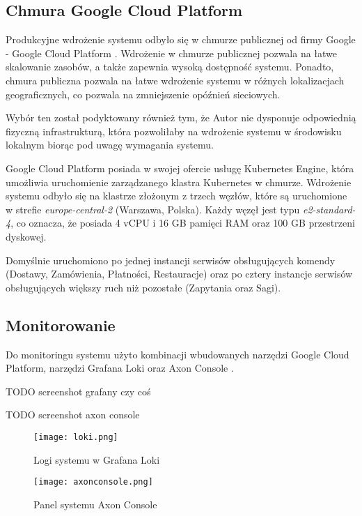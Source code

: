 \subsection{Chmura Google Cloud Platform}

Produkcyjne wdrożenie systemu odbyło się w chmurze publicznej od firmy Google - Google Cloud Platform \cite{gcp}. Wdrożenie w chmurze publicznej pozwala na łatwe skalowanie zasobów, a także zapewnia wysoką dostępność systemu. Ponadto, chmura publiczna pozwala na łatwe wdrożenie systemu w różnych lokalizacjach geograficznych, co pozwala na zmniejszenie opóźnień sieciowych. 

Wybór ten został podyktowany również tym, że Autor nie dysponuje odpowiednią fizyczną infrastrukturą, która pozwoliłaby na wdrożenie systemu w środowisku lokalnym biorąc pod uwagę wymagania systemu.

Google Cloud Platform posiada w swojej ofercie usługę Kubernetes Engine, która umożliwia uruchomienie zarządzanego klastra Kubernetes w chmurze. Wdrożenie systemu odbyło się na klastrze złożonym z trzech węzłów, które są uruchomione w strefie \textit{europe-central-2} (Warszawa, Polska). Każdy węzęł jest typu \textit{e2-standard-4}, co oznacza, że posiada 4 vCPU i 16 GB pamięci RAM oraz 100 GB przestrzeni dyskowej.

Domyślnie uruchomiono po jednej instancji serwisów obsługujących komendy (Dostawy, Zamówienia, Płatności, Restauracje) oraz po cztery instancje serwisów obsługujących większy ruch niż pozostałe (Zapytania oraz Sagi).

\subsection{Monitorowanie}

Do monitoringu systemu użyto kombinacji wbudowanych narzędzi Google Cloud Platform, narzędzi Grafana Loki \cite{grafana-loki} oraz Axon Console \cite{axon-console}.

TODO screenshot grafany czy coś

TODO screenshot axon console

\begin{figure}[!h]
    \centering \texttt{[image: loki.png]}
    \caption{Logi systemu w Grafana Loki}
    \label{fig:loki}
\end{figure}

\begin{figure}[!h]
    \centering \texttt{[image: axonconsole.png]}
    \caption{Panel systemu Axon Console}
    \label{fig:axonconsole}
\end{figure}